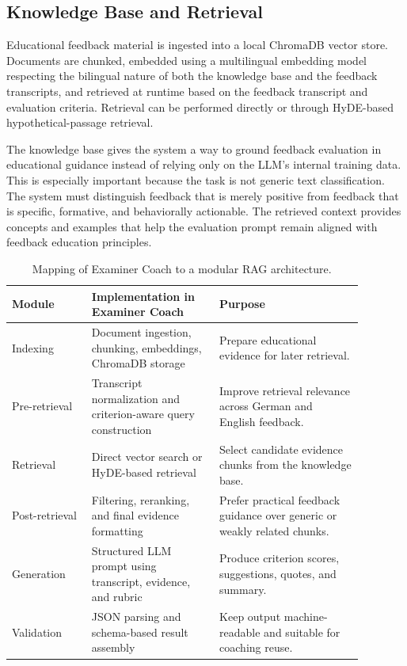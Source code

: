 \subsection{Knowledge Base and Retrieval}
Educational feedback material is ingested into a local ChromaDB vector store.
Documents are chunked, embedded using a multilingual embedding model respecting the bilingual nature of both the knowledge base and the feedback transcripts, and
retrieved at runtime based on the feedback transcript and evaluation criteria.
Retrieval can be performed directly or through HyDE-based hypothetical-passage
retrieval.

The knowledge base gives the system a way to ground feedback evaluation in
educational guidance instead of relying only on the LLM's internal training
data. This is especially important because the task is not generic text
classification. The system must distinguish feedback that is merely positive
from feedback that is specific, formative, and behaviorally actionable. The
retrieved context provides concepts and examples that help the evaluation prompt
remain aligned with feedback education principles.

\begin{table}[ht]
    \centering
    \small
    \begin{tabular}{L{0.20\linewidth}L{0.32\linewidth}L{0.36\linewidth}}
        \toprule
        Module & Implementation in Examiner Coach & Purpose \\
        \midrule
        Indexing & Document ingestion, chunking, embeddings, ChromaDB storage
        & Prepare educational evidence for later retrieval. \\
        Pre-retrieval & Transcript normalization and criterion-aware query
        construction & Improve retrieval relevance across German and English
        feedback. \\
        Retrieval & Direct vector search or HyDE-based retrieval & Select
        candidate evidence chunks from the knowledge base. \\
        Post-retrieval & Filtering, reranking, and final evidence formatting
        & Prefer practical feedback guidance over generic or weakly related
        chunks. \\
        Generation & Structured LLM prompt using transcript, evidence, and
        rubric & Produce criterion scores, suggestions, quotes, and summary. \\
        Validation & JSON parsing and schema-based result assembly & Keep
        output machine-readable and suitable for coaching reuse. \\
        \bottomrule
    \end{tabular}
    \caption{Mapping of Examiner Coach to a modular RAG architecture.}
    \label{tab:modular-rag-mapping}
\end{table}

